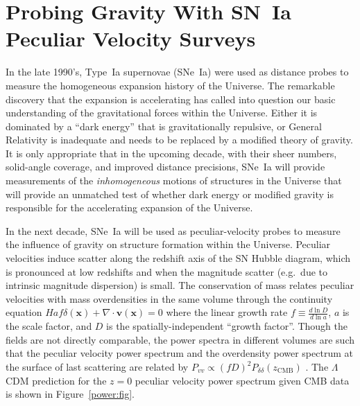 \section{Probing Gravity With SN~Ia  Peculiar Velocity Surveys}
In the late 1990's, Type~Ia supernovae (SNe~Ia) were used as distance probes to measure the homogeneous expansion history of the Universe.  The remarkable discovery
that the expansion is accelerating  has called into question our basic understanding of the gravitational forces within the Universe.  Either it
is dominated by a ``dark energy'' that is gravitationally repulsive, or General Relativity is inadequate and needs to be replaced by a modified theory of
gravity.  It is only appropriate that in the upcoming decade, with their sheer numbers, solid-angle coverage,
and improved distance precisions, SNe~Ia will provide measurements of the {\it inhomogeneous} motions of structures in the Universe
that will provide an unmatched test of whether dark energy or modified gravity is responsible for the accelerating expansion of the Universe.

In the next decade, SNe~Ia will be used as peculiar-velocity probes to measure  the influence of gravity on structure formation within the Universe.
Peculiar velocities induce scatter along the redshift axis of the SN Hubble diagram, which is
pronounced at low redshifts and when the magnitude scatter (e.g.\ due to intrinsic magnitude dispersion) is small.
The conservation of mass relates peculiar velocities  with mass overdensities in the same volume through the continuity equation
$Haf\delta(\mathbf{x}) + \nabla \cdot \mathbf{v}(\mathbf{x}) =0$ where the linear growth rate $f \equiv \frac{d\ln{D}}{d\ln{a}}$, $a$ is the scale factor, and $D$ is  the spatially-independent
``growth factor''.
Though the fields are not directly comparable, the power spectra in different volumes are such that
the peculiar velocity power spectrum and the overdensity power spectrum at the surface of last scattering are related by
$P_{vv}\propto (fD)^2P_{\delta \delta}(z_{\text{CMB}})$  \citep{2006PhRvD..73l3526H,2011ApJ...741...67D}. 
The $\Lambda$CDM prediction for the $z=0$ peculiar velocity power spectrum given CMB data is shown in Figure~\ref{power:fig}.


